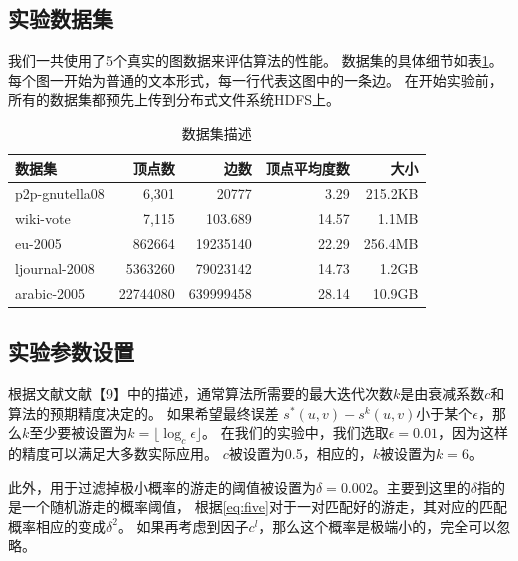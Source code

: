 \documentclass[master]{njuthesis}
\begin{document}
\subsection{实验数据集}
我们一共使用了5个真实的图数据来评估算法的性能。 数据集的具体细节如表\ref{tab:dataset1}。
每个图一开始为普通的文本形式，每一行代表这图中的一条边。
在开始实验前，所有的数据集都预先上传到分布式文件系统HDFS上。
\begin{table}[h]
\caption{数据集描述}
\label{tab:dataset1}
\centering
\begin{tabular}{|l|r|r|r|r|}
\hline
\textbf{数据集} & \textbf{顶点数} & \textbf{边数} & \textbf{顶点平均度数} & \textbf{大小} \\
\hline
p2p-gnutella08 \footnotemark[1]  & {6,301}         & \num{20777}                   & 3.29                & 215.2KB\\
\hline
wiki-vote \footnotemark[2]    & 7,115 	& \num{103,689}                           &14.57                & 1.1MB  \\
\hline
eu-2005       \footnotemark[3]     & \num{862664}  & \num{19235140 }          & 22.29             & 256.4MB\\
\hline
ljournal-2008  \footnotemark[4] & \num{5363260} & \num{79023142}         & 14.73            &1.2GB\\
\hline
arabic-2005 \footnotemark[5]   & \num{22744080} & \num{639999458}      & 28.14           & 10.9GB\\
\hline
\end{tabular}
\end{table}
\subsection{实验参数设置}
根据文献文献【9】中的描述，通常算法所需要的最大迭代次数$k$是由衰减系数$c$和算法的预期精度决定的。 
如果希望最终误差 $s^*(u,v) - s^k(u,v)$小于某个$\epsilon$，那么$k$至少要被设置为$k=\lfloor \log_c \epsilon \rfloor$。
在我们的实验中，我们选取$\epsilon=0.01$，因为这样的精度可以满足大多数实际应用。 
$c$被设置为0.5，相应的，$k$被设置为$k=6$。

此外，用于过滤掉极小概率的游走的阈值被设置为$\delta=0.002$。主要到这里的$\delta$指的是一个随机游走的概率阈值，
根据\ref{eq:five}对于一对匹配好的游走，其对应的匹配概率相应的变成${\delta}^2$。
如果再考虑到因子$c^l$，那么这个概率是极端小的，完全可以忽略。
\end{document}
